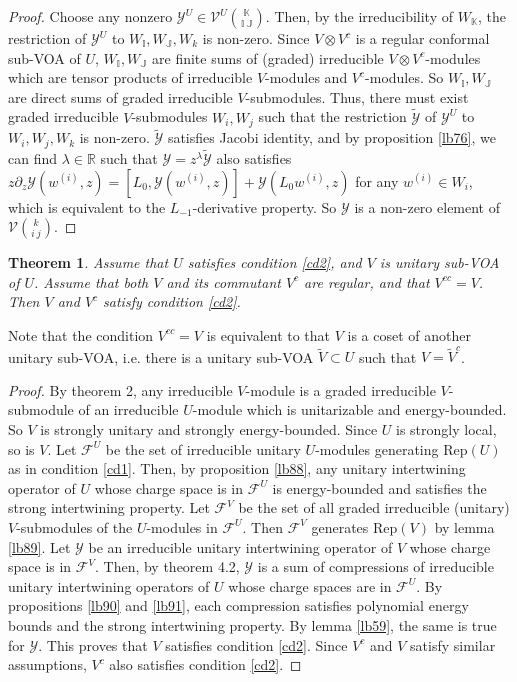 \documentclass[11pt,b5paper,notitlepage]{article}
\theoremstyle{definition}
\theoremstyle{plain}
\newtheorem{thm}[df]{Theorem}
\newcommand{\mc}{\mathcal}
\newcommand{\wtd}{\widetilde}
\newcommand{\Rep}{\mathrm{Rep}}
\newcommand{\mbb}{\mathbb}
\numberwithin{equation}{subsection}
\begin{document}
\begin{proof}
Choose any nonzero $\mc Y^U\in\mc V^U{\mbb K\choose \mbb I~\mbb J}$. Then, by the irreducibility of $W_{\mbb K}$, the restriction of $\mc Y^U$ to $W_{\mbb I},W_{\mbb J},W_k$ is non-zero. Since $V\otimes V^c$ is a regular conformal sub-VOA of $U$,   $W_{\mbb I},W_{\mbb J}$ are finite sums of (graded) irreducible $V\otimes V^c$-modules which are tensor products of irreducible $V$-modules and $V^c$-modules. So $W_{\mbb I},W_{\mbb J}$ are direct sums of graded irreducible $V$-submodules. Thus, there must exist graded irreducible $V$-submodules $W_i,W_j$ such that the restriction $\wtd{\mc Y}$ of $\mc Y^U$ to $W_i,W_j,W_k$ is non-zero. $\wtd{\mc Y}$ satisfies Jacobi identity, and by proposition \ref{lb76}, we can find $\lambda\in\mbb R$ such that $\mc Y=z^\lambda\wtd{\mc Y}$ also satisfies $z\partial_z\mc Y(w^{(i)},z)=[L_0,\mc Y(w^{(i)},z)]+\mc Y(L_0w^{(i)},z)$ for any $w^{(i)}\in W_i$, which is equivalent to the $L_{-1}$-derivative property. So $\mc Y$ is a non-zero element of $\mc V{k\choose i~j}$.
\end{proof}

\begin{thm}\label{lb92}
Assume that $U$ satisfies condition \ref{cd2}, and $V$ is  unitary sub-VOA of $U$. Assume that both $V$ and its commutant $V^c$ are regular, and that $V^{cc}=V$. Then $V$ and $V^c$ satisfy condition \ref{cd2}.
\end{thm}
Note that the condition $V^{cc}=V$ is equivalent to that $V$ is a coset of another unitary sub-VOA, i.e. there is a unitary sub-VOA $\wtd V\subset U$ such that $V=\wtd V^c$.



\begin{proof}
By \cite{KM15} theorem 2, any irreducible $V$-module is a graded irreducible $V$-submodule of an irreducible $U$-module which is unitarizable and energy-bounded. So $V$ is strongly unitary and strongly energy-bounded. Since $U$ is strongly local, so is $V$. Let $\mc F^U$ be the set of irreducible unitary $U$-modules generating $\Rep(U)$ as in condition \ref{cd1}. Then, by proposition \ref{lb88}, any unitary intertwining operator of $U$ whose charge space is in $\mc F^U$ is energy-bounded and satisfies the strong intertwining property. Let $\mc F^V$ be the set of all graded irreducible (unitary) $V$-submodules of the $U$-modules in $\mc F^U$. Then $\mc F^V$ generates $\Rep(V)$ by lemma \ref{lb89}. Let $\mc Y$ be an irreducible unitary intertwining operator of $V$ whose charge space is in $\mc F^V$. Then, by \cite{Gui20a} theorem 4.2, $\mc Y$ is a sum of  compressions of  irreducible unitary intertwining operators of $U$ whose charge spaces are in $\mc F^U$. By propositions \ref{lb90} and  \ref{lb91}, each compression satisfies polynomial energy bounds and  the strong intertwining property. By lemma \ref{lb59}, the same is true for $\mc Y$. This proves that $V$ satisfies condition \ref{cd2}. Since $V^c$ and $V$ satisfy similar assumptions,  $V^c$ also satisfies condition \ref{cd2}.
\end{proof}
\end{document}
